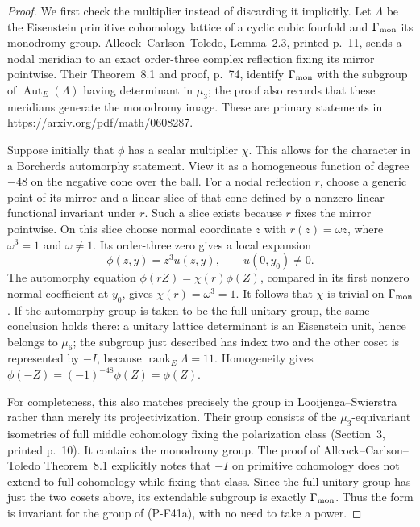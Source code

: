 \documentclass[11pt,a4paper]{article}
\begin{document}
\begin{proof}
We first check the multiplier instead of discarding it implicitly.
Let $\Lambda$ be the Eisenstein primitive cohomology lattice of
a cyclic cubic fourfold and $\Gamma_{\rm mon}$ its monodromy group.
Allcock--Carlson--Toledo, Lemma~2.3, printed p.~11, sends a
nodal meridian to an exact order-three complex reflection fixing
its mirror pointwise. Their Theorem~8.1 and proof, p.~74,
identify $\Gamma_{\rm mon}$ with the subgroup of
$\operatorname{Aut}_E(\Lambda)$ having determinant in $\mu_3$;
the proof also records that these meridians generate the
monodromy image. These are primary statements in
\url{https://arxiv.org/pdf/math/0608287}.

Suppose initially that $\phi$ has a scalar multiplier $\chi$.
This allows for the character in a Borcherds automorphy statement.
View it as a homogeneous function of degree $-48$ on the
negative cone over the ball. For a nodal reflection $r$, choose
a generic point of its mirror and a linear slice of that cone
defined by a nonzero linear functional invariant under $r$.
Such a slice exists because $r$ fixes the mirror pointwise.
On this slice choose normal coordinate $z$ with
$r(z)=\omega z$, where $\omega^3=1$ and $\omega\ne1$.
Its order-three zero gives a local expansion
\[
               \phi(z,y)=z^3 u(z,y),\qquad u(0,y_0)\ne0.
\]
The automorphy equation $\phi(rZ)=\chi(r)\phi(Z)$,
compared in its first nonzero normal coefficient at $y_0$,
gives $\chi(r)=\omega^3=1$. It follows that
$\chi$ is trivial on $\Gamma_{\rm mon}$.
If the automorphy group is taken to be the full unitary group,
the same conclusion holds there: a unitary lattice determinant
is an Eisenstein unit, hence belongs to $\mu_6$; the subgroup
just described has index two and the other coset is represented
by $-I$, because $\operatorname{rank}_E\Lambda=11$.
Homogeneity gives $\phi(-Z)=(-1)^{-48}\phi(Z)=\phi(Z)$.

For completeness, this also matches precisely the group in
Looijenga--Swierstra rather than merely its projectivization.
Their group consists of the $\mu_3$-equivariant isometries
of full middle cohomology fixing the polarization class
(Section~3, printed p.~10). It contains the monodromy group.
The proof of Allcock--Carlson--Toledo Theorem~8.1 explicitly
notes that $-I$ on primitive cohomology does not extend to
full cohomology while fixing that class. Since the full
unitary group has just the two cosets above, its extendable
subgroup is exactly $\Gamma_{\rm mon}$. Thus the form is
invariant for the group of (P-F41a), with no need to take a power.


\end{proof}
\end{document}
